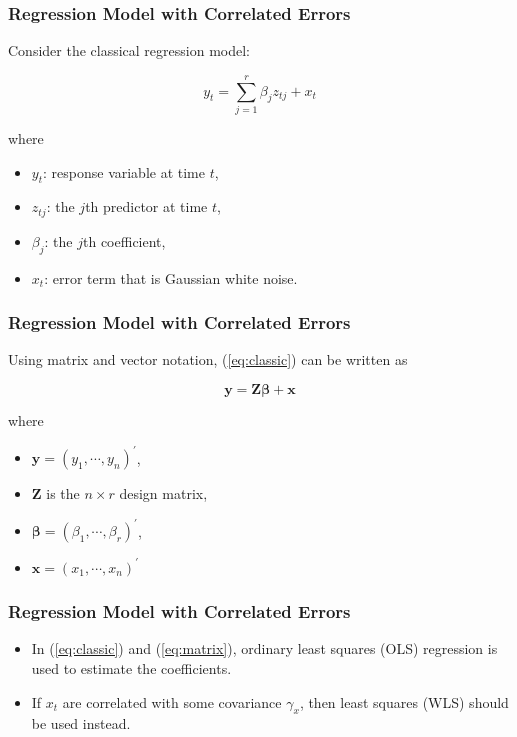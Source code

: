 \documentclass[%
xcolor=pdftex]{beamer}
\begin{document}
\begin{frame}
\frametitle{Regression Model with Correlated Errors}

Consider the classical regression model:

\begin{equation} \label{eq:classic}
y_t = \sum_{j=1}^r \beta_j z_{tj} + x_t
\end{equation}

where

\begin{itemize}
\item $y_t$: response variable at time $t$,
\item $z_{tj}$: the $j$th predictor at time $t$,
\item $\beta_j$: the $j$th coefficient,
\item $x_t$: error term that is Gaussian white noise.
\end{itemize}

\end{frame}



\begin{frame}
\frametitle{Regression Model with Correlated Errors}

Using matrix and vector notation, (\ref{eq:classic}) can be written as

\begin{equation} \label{eq:matrix}
\boldsymbol{y} = \boldsymbol{Z \beta} + \boldsymbol{x}
\end{equation}

where

\begin{itemize}
\item $\boldsymbol{y} = (y_1, \cdots, y_n)^\prime$,
\item $\boldsymbol{Z}$ is the $n \times r$ design matrix,
\item $\boldsymbol{\beta} = (\beta_1, \cdots, \beta_r)^\prime$,
\item $\boldsymbol{x} = (x_1, \cdots, x_n)^\prime$
\end{itemize}

\end{frame}

\begin{frame}
\frametitle{Regression Model with Correlated Errors}

\begin{itemize}
\item In (\ref{eq:classic}) and (\ref{eq:matrix}), ordinary least squares (OLS) regression is used to estimate the coefficients.
\item If $x_t$ are correlated with some covariance $\gamma_x$, then \underline{\hspace{15 mm}} least squares (WLS) should be used instead.
\end{itemize}


\end{frame}
\end{document}
